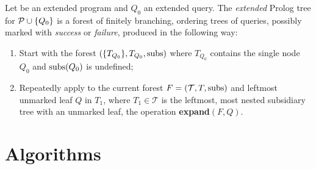 \begin{dfn}
    Let \prog be an extended program and \(Q_0\) an extended query.
    The \emph{extended} Prolog tree for \(\mathcal{P} \cup \lbrace Q_0 \rbrace\) is a forest of finitely branching, ordering trees of queries, possibly marked with \emph{success} or \emph{failure}, produced in the following way:
    \begin{enumerate}
        \item Start with the forest \((\lbrace T_{Q_0} \rbrace, T_{Q_0},\operatorname{subs})\) where \(T_{Q_0}\) contains the single node \(Q_0\) and \(\operatorname{subs}(Q_0)\) is undefined;
        \item Repeatedly apply to the current forest \(F = (\mathcal{T},T,\operatorname{subs})\) and leftmost unmarked leaf \(Q\) in \(T_1\), where \(T_1 \in \mathcal{T}\) is the leftmost, most nested subsidiary tree with an unmarked leaf, the operation \textbf{expand}\((F,Q)\).
    \end{enumerate}
\end{dfn}

\section{Algorithms}

